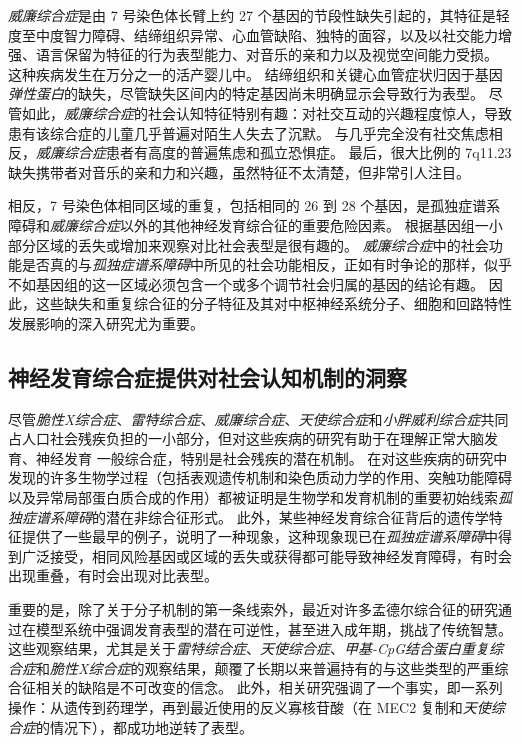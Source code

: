 \textit{威廉综合症}是由 7 号染色体长臂上约 27 个基因的节段性缺失引起的，其特征是轻度至中度智力障碍、结缔组织异常、心血管缺陷、独特的面容，以及以社交能力增强、语言保留为特征的行为表型能力、对音乐的亲和力以及视觉空间能力受损。
这种疾病发生在万分之一的活产婴儿中。
结缔组织和关键心血管症状归因于基因\textit{弹性蛋白}的缺失，尽管缺失区间内的特定基因尚未明确显示会导致行为表型。
尽管如此，\textit{威廉综合症}的社会认知特征特别有趣：对社交互动的兴趣程度惊人，导致患有该综合症的儿童几乎普遍对陌生人失去了沉默。
与几乎完全没有社交焦虑相反，\textit{威廉综合症}患者有高度的普遍焦虑和孤立恐惧症。
最后，很大比例的 7q11.23 缺失携带者对音乐的亲和力和兴趣，虽然特征不太清楚，但非常引人注目。


相反，7 号染色体相同区域的重复，包括相同的 26 到 28 个基因，是孤独症谱系障碍和\textit{威廉综合症}以外的其他神经发育综合征的重要危险因素。
根据基因组一小部分区域的丢失或增加来观察对比社会表型是很有趣的。
\textit{威廉综合症}中的社会功能是否真的与\textit{孤独症谱系障碍}中所见的社会功能相反，正如有时争论的那样，似乎不如基因组的这一区域必须包含一个或多个调节社会归属的基因的结论有趣。
因此，这些缺失和重复综合征的分子特征及其对中枢神经系统分子、细胞和回路特性发展影响的深入研究尤为重要。



\subsection{神经发育综合症提供对社会认知机制的洞察}

尽管\textit{脆性X综合症}、\textit{雷特综合症}、\textit{威廉综合症}、\textit{天使综合症}和\textit{小胖威利综合症}共同占人口社会残疾负担的一小部分，但对这些疾病的研究有助于在理解正常大脑发育、神经发育 一般综合症，特别是社会残疾的潜在机制。
在对这些疾病的研究中发现的许多生物学过程（包括表观遗传机制和染色质动力学的作用、突触功能障碍以及异常局部蛋白质合成的作用）都被证明是生物学和发育机制的重要初始线索\textit{孤独症谱系障碍}的潜在非综合征形式。
此外，某些神经发育综合征背后的遗传学特征提供了一些最早的例子，说明了一种现象，这种现象现已在\textit{孤独症谱系障碍}中得到广泛接受，相同风险基因或区域的丢失或获得都可能导致神经发育障碍，有时会出现重叠，有时会出现对比表型。


重要的是，除了关于分子机制的第一条线索外，最近对许多孟德尔综合征的研究通过在模型系统中强调发育表型的潜在可逆性，甚至进入成年期，挑战了传统智慧。
这些观察结果，尤其是关于\textit{雷特综合症}、\textit{天使综合症}、\textit{甲基-CpG结合蛋白重复综合症}和\textit{脆性X综合症}的观察结果，颠覆了长期以来普遍持有的与这些类型的严重综合征相关的缺陷是不可改变的信念。
此外，相关研究强调了一个事实，即一系列操作：从遗传到药理学，再到最近使用的反义寡核苷酸（在 MEC2 复制和\textit{天使综合症}的情况下），都成功地逆转了表型。


